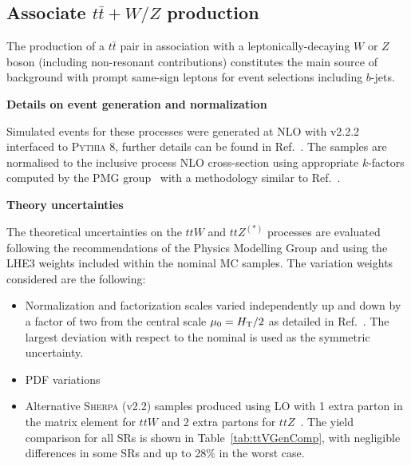 \subsection{Associate $t\bar t+W/Z$ production}
\label{subsec:promptbkg_ttv}

The production of a $t\bar t$ pair in association with a leptonically-decaying $W$ or $Z$ boson (including non-resonant contributions) 
constitutes the main source of background with prompt same-sign leptons for event selections including $b$-jets. 


\par{\bf Details on event generation and normalization\\}

Simulated events for these processes were generated at NLO with \AMCATNLO v2.2.2~\cite{Alwall:2014hca} interfaced to \textsc{Pythia} 8, 
further details can be found in Ref.~\cite{ATL-PHYS-PUB-2016-005}. 
The samples are normalised to the inclusive process NLO cross-section using appropriate $k$-factors 
computed by the PMG group~\cite{twiki-xsections-ttx,ATL-PHYS-PUB-2016-005} with a methodology similar to Ref.~\cite{Alwall:2014hca}. 


\par{\bf Theory uncertainties \\}

The theoretical uncertainties on the $ttW$ and $ttZ^{(*)}$ processes are evaluated following the recommendations of the Physics Modelling Group and using the LHE3 weights included within the nominal MC samples. The variation weights considered are the following:

\begin{itemize}
\item Normalization and factorization scales varied independently up and down by a factor of two from the central scale $\mu_0 = H_{\rm T}/2$ as detailed in Ref.~\cite{ATL-PHYS-PUB-2016-005}. The largest deviation with respect to the nominal is used as the symmetric uncertainty.
\item PDF variations 
\item Alternative \textsc{Sherpa} (v2.2) samples produced using LO with 1 extra parton in the matrix element for $ttW$ and 2 extra partons for $ttZ$~\cite{ATL-PHYS-PUB-2016-005}. The yield comparison for all SRs is shown in Table~\ref{tab:ttVGenComp}, with negligible differences in some SRs and up to 28\% in the worst case.
\end{itemize}

